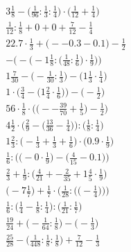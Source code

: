 \documentclass[8pt]{article}
\begin{document}
\begin{align}
3\frac{1}{8} - \big(\frac{1}{96} : \frac{1}{3} : \frac{1}{4}\big) \cdot \big(\frac{1}{12} + \frac{1}{4}\big) \\
\frac{1}{12} : \frac{1}{8} + 0 + 0 + \frac{7}{12} - \frac{1}{4} \\
22.7 \cdot \frac{1}{3} + \big(--0.3 - 0.1\big) - \frac{1}{2} \\
-\bigg(-\Big(-1\frac{1}{8} : \big(\frac{1}{48} : \frac{1}{6}\big) \cdot \frac{1}{9}\Big)\bigg) \\
1\frac{7}{30} - \big(-\frac{1}{30} : \frac{1}{3}\big) - \big(1\frac{1}{3} \cdot \frac{1}{4}\big) \\
1 \cdot \Big(\frac{3}{4} - \big(1\frac{2}{4} \cdot \frac{1}{6}\big)\Big) - \Big(-\frac{1}{2}\Big) \\
56 \cdot \frac{1}{8} \cdot \Big(\big(--\frac{39}{70} + \frac{1}{5}\big) - \frac{1}{2}\Big) \\
4\frac{1}{2} \cdot \Big(\frac{2}{9} - \big(\frac{13}{36} - \frac{1}{4}\big)\Big) : \Big(\frac{1}{8} : \frac{1}{4}\Big) \\
1\frac{2}{3} : \big(-\frac{1}{3} + \frac{1}{3} + \frac{1}{6}\big) \cdot \big(0.9 \cdot \frac{1}{9}\big) \\
\frac{1}{6} : \Big(\big(-0 \cdot \frac{1}{9}\big) - \big(\frac{4}{15} - 0.1\big)\Big) \\
\frac{2}{3} + \frac{1}{9} : \big(\frac{4}{21} + -\frac{2}{35} + 1\frac{4}{5} \cdot \frac{1}{9}\big) \\
\bigg(-7\frac{1}{7}\bigg) + \frac{1}{7} \cdot \bigg(\frac{1}{28} : \Big(\big(-\frac{1}{4}\big)\Big)\bigg) \\
\frac{1}{6} : \big(\frac{1}{4} - \frac{1}{8} : \frac{1}{4}\big) : \big(\frac{1}{21} : \frac{1}{7}\big) \\
\frac{19}{24} + \big(-\frac{1}{64} : \frac{1}{8}\big) - \big(-\frac{1}{3}\big) \\
\frac{25}{28} - \big(\frac{1}{448} : \frac{1}{8} : \frac{1}{8}\big) + \frac{7}{12} - \frac{1}{3}
\end{align}
\end{document}
